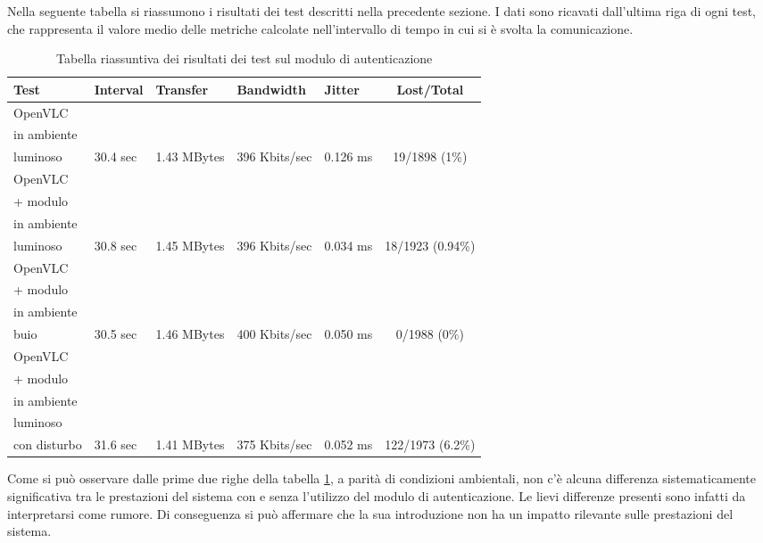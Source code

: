 Nella seguente tabella si riassumono i risultati dei test descritti nella precedente sezione. I dati sono ricavati dall'ultima riga di ogni test, che rappresenta il valore medio delle metriche calcolate nell'intervallo di tempo in cui si è svolta la comunicazione.
\begin{table}[H]
    \caption{Tabella riassuntiva dei risultati dei test sul modulo di autenticazione}
    \label{tab:riass-test-auth}
    \begin{tabularx}{\textwidth}{lllllc}
        \hline
        \textbf{Test} & \textbf{Interval} & \textbf{Transfer} & \textbf{Bandwidth} & \textbf{Jitter} & \textbf{Lost/Total}\\
        \hline
        OpenVLC\\in ambiente\\luminoso & 30.4 sec & 1.43 MBytes & 396 Kbits/sec & 0.126 ms & 19/1898 (1\%) \\
        \hline
        OpenVLC\\+ modulo\\in ambiente\\luminoso & 30.8 sec & 1.45 MBytes & 396 Kbits/sec & 0.034 ms & 18/1923 (0.94\%) \\
        \hline
        OpenVLC\\+ modulo\\in ambiente\\buio & 30.5 sec & 1.46 MBytes & 400 Kbits/sec & 0.050 ms & 0/1988 (0\%) \\
        \hline
        OpenVLC\\+ modulo\\in ambiente\\luminoso\\con disturbo & 31.6 sec & 1.41 MBytes & 375 Kbits/sec & 0.052 ms & 122/1973 (6.2\%) \\
        \hline
    \end{tabularx}
\end{table}

\noindent Come si può osservare dalle prime due righe della tabella \ref{tab:riass-test-auth}, a parità di condizioni ambientali, non c'è alcuna differenza sistematicamente significativa tra le prestazioni del sistema con e senza l'utilizzo del modulo di autenticazione. Le lievi differenze presenti sono infatti da interpretarsi come rumore. Di conseguenza si può affermare che la sua introduzione non ha un impatto rilevante sulle prestazioni del sistema.

